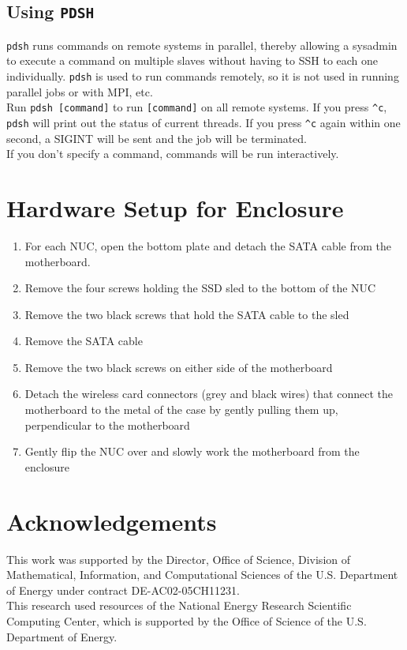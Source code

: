 \documentclass{article}
\begin{document}
\subsection{Using \texttt{PDSH}}
\texttt{pdsh} runs commands on remote systems in parallel, thereby allowing a sysadmin
to execute a command on multiple slaves without having to SSH to each one
individually.  \texttt{pdsh} is used to run commands remotely, so it is not used in
running parallel jobs or with MPI, etc.\\

Run \texttt{pdsh [command]} to run \texttt{[command]} on all remote systems.
If you press \texttt{\textasciicircum c}, \texttt{pdsh} will print out the
status of current threads.  If you press \texttt{\textasciicircum c} again
within one second, a SIGINT will be sent and the job will be terminated.\\

If you don't specify a command, commands will be run interactively.

\section{Hardware Setup for Enclosure}
\begin{enumerate}
    \item For each NUC, open the bottom plate and detach the SATA cable from the
        motherboard.
    \item Remove the four screws holding the SSD sled to the bottom of the NUC
    \item Remove the two black screws that hold the SATA cable to the sled
    \item Remove the SATA cable
    \item Remove the two black screws on either side of the motherboard
    \item Detach the wireless card connectors (grey and black wires) that
        connect the motherboard to the metal of the case by gently pulling them
        up, perpendicular to the motherboard
    \item Gently flip the NUC over and slowly work the motherboard from the
        enclosure
\end{enumerate}

\section{Acknowledgements}
This work was supported by the Director, Office of Science, Division of
Mathematical, Information, and Computational Sciences of the U.S. Department of
Energy under contract DE-AC02-05CH11231.\\

This research used resources of the National Energy Research Scientific
Computing Center, which is supported by the Office of Science of the U.S.
Department of Energy.
\end{document}
